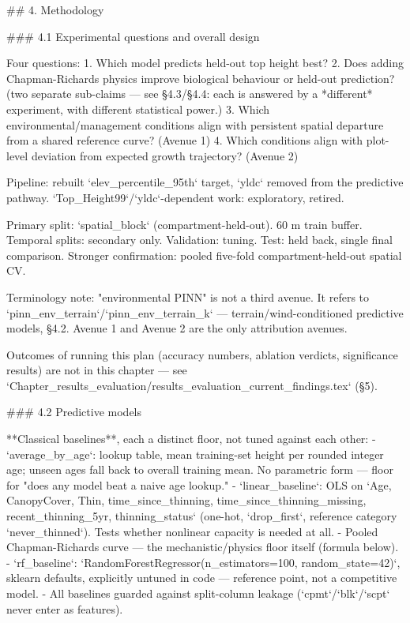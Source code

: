 ## 4. Methodology

### 4.1 Experimental questions and overall design

Four questions:
1. Which model predicts held-out top height best?
2. Does adding Chapman-Richards physics improve biological behaviour or held-out prediction? (two separate sub-claims — see §4.3/§4.4: each is answered by a *different* experiment, with different statistical power.)
3. Which environmental/management conditions align with persistent spatial departure from a shared reference curve? (Avenue 1)
4. Which conditions align with plot-level deviation from expected growth trajectory? (Avenue 2)

Pipeline: rebuilt `elev_percentile_95th` target, `yldc` removed from the predictive pathway. `Top_Height99`/`yldc`-dependent work: exploratory, retired.

Primary split: `spatial_block` (compartment-held-out). 60 m train buffer. Temporal splits: secondary only.
Validation: tuning. Test: held back, single final comparison. Stronger confirmation: pooled five-fold compartment-held-out spatial CV.

Terminology note: "environmental PINN" is not a third avenue. It refers to `pinn_env_terrain`/`pinn_env_terrain_k` — terrain/wind-conditioned predictive models, §4.2. Avenue 1 and Avenue 2 are the only attribution avenues.

Outcomes of running this plan (accuracy numbers, ablation verdicts, significance results) are not in this chapter — see `Chapter_results_evaluation/results_evaluation_current_findings.tex` (§5).

### 4.2 Predictive models

**Classical baselines**, each a distinct floor, not tuned against each other:
- `average_by_age`: lookup table, mean training-set height per rounded integer age; unseen ages fall back to overall training mean. No parametric form — floor for "does any model beat a naive age lookup."
- `linear_baseline`: OLS on `Age, CanopyCover, Thin, time_since_thinning, time_since_thinning_missing, recent_thinning_5yr, thinning_status` (one-hot, `drop_first`, reference category `never_thinned`). Tests whether nonlinear capacity is needed at all.
- Pooled Chapman-Richards curve — the mechanistic/physics floor itself (formula below).
- `rf_baseline`: `RandomForestRegressor(n_estimators=100, random_state=42)`, sklearn defaults, explicitly untuned in code — reference point, not a competitive model.
- All baselines guarded against split-column leakage (`cpmt`/`blk`/`scpt` never enter as features).

